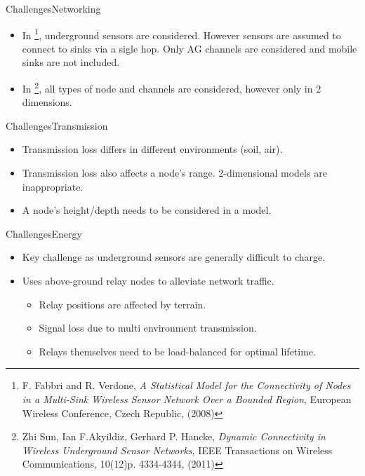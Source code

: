 \documentclass[main.tex]{subfiles}
\begin{document}
\begin{frame}{Challenges}{Networking}
	\begin{itemize}
		\item In \footnote{F. Fabbri and R. Verdone, \textit{A Statistical Model for the Connectivity of Nodes in a Multi-Sink Wireless Sensor Network Over a Bounded Region}, European Wireless Conference, Czech Republic, (2008)}, underground sensors are considered. However sensors are assumed to connect to sinks via a sigle hop. Only AG channels are considered and mobile sinks are not included.
		\item In \footnote{Zhi Sun, Ian F.Akyildiz, Gerhard P. Hancke, \textit{Dynamic Connectivity in Wireless Underground Sensor Networks}, IEEE Transactions on Wireless Communications, 10(12)p. 4334-4344, (2011)}, all types of node and channels are considered, however only in 2 dimensions.
	\end{itemize}
\end{frame}

\begin{frame}{Challenges}{Transmission}
	\begin{itemize}
		\item Transmission loss differs in different environments (soil, air).
		\item Transmission loss also affects a node's range. 2-dimensional models are inappropriate.
		\item A node's height/depth needs to be considered in a model.
	\end{itemize}
\end{frame}

\begin{frame}{Challenges}{Energy}
	\begin{itemize}
		\item Key challenge as underground sensors are generally difficult to charge.
		\item { 
			Uses above-ground relay nodes to alleviate network traffic.
			\begin{itemize}
				\item Relay positions are affected by terrain.
				\item Signal loss due to multi environment transmission.
				\item Relays themselves need to be load-balanced for optimal lifetime.
			\end{itemize}
		}
	\end{itemize}
\end{frame}
\end{document}
